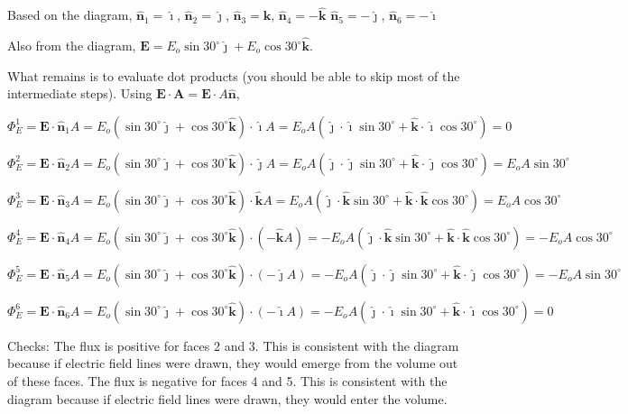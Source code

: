 \documentclass{article}
\newcommand{\ihat}[0]{\hat{\boldsymbol{\imath}}}
\newcommand{\jhat}[0]{\hat{\boldsymbol{\jmath}}}
\newcommand{\khat}[0]{\hat{\boldsymbol{k}}}
\begin{document}
Based on the diagram, $\hat{\mathbf{n}}_1=\ihat$, $\hat{\mathbf{n}}_2=\jhat$, $\hat{\mathbf{n}}_3=\khat$, $\hat{\mathbf{n}}_4=-\khat$
$\hat{\mathbf{n}}_5=-\jhat$, $\hat{\mathbf{n}}_6=-\ihat$

Also from the diagram, $\mathbf{E}=E_o\sin30^\circ\jhat+E_o\cos30^\circ\khat$.

What remains is to evaluate dot products (you should be able to skip most of the intermediate steps). Using $\mathbf{E}\cdot\mathbf{A}=\mathbf{E}\cdot A\hat{\mathbf{n}}$,

\begin{equation}
\Phi_E^1=\mathbf{E}\cdot \hat{\mathbf{n}}_1A=E_o(\sin 30^\circ\jhat+\cos 30^\circ\khat)\cdot\ihat A = E_oA(\jhat\cdot\ihat\sin 30^\circ+\khat\cdot\ihat\cos 30^\circ)=0
\end{equation}

\begin{equation}
\Phi_E^2=\mathbf{E}\cdot \hat{\mathbf{n}}_2A=E_o(\sin 30^\circ\jhat+\cos 30^\circ\khat)\cdot\jhat A = E_oA(\jhat\cdot\jhat\sin 30^\circ+\khat\cdot\jhat\cos 30^\circ)=E_oA\sin 30^\circ
\end{equation}

\begin{equation}
\Phi_E^3=\mathbf{E}\cdot \hat{\mathbf{n}}_3A=E_o(\sin 30^\circ\jhat+\cos 30^\circ\khat)\cdot\khat A = E_oA(\jhat\cdot\khat\sin 30^\circ+\khat\cdot\khat\cos 30^\circ)=E_oA\cos 30^\circ
\end{equation}

\begin{equation}
\Phi_E^4=\mathbf{E}\cdot \hat{\mathbf{n}}_4A=E_o(\sin 30^\circ\jhat+\cos 30^\circ\khat)\cdot(-\khat A) = -E_oA(\jhat\cdot\khat\sin 30^\circ+\khat\cdot\khat\cos 30^\circ)=-E_oA\cos 30^\circ
\end{equation}

\begin{equation}
\Phi_E^5=\mathbf{E}\cdot \hat{\mathbf{n}}_5A=E_o(\sin 30^\circ\jhat+\cos 30^\circ\khat)\cdot(-\jhat A) = -E_oA(\jhat\cdot\jhat\sin 30^\circ+\khat\cdot\jhat\cos 30^\circ)=-E_oA\sin 30^\circ
\end{equation}

\begin{equation}
\Phi_E^6=\mathbf{E}\cdot \hat{\mathbf{n}}_6A=E_o(\sin 30^\circ\jhat+\cos 30^\circ\khat)\cdot(-\ihat A) =  -E_oA(\jhat\cdot\ihat\sin 30^\circ+\khat\cdot\ihat\cos 30^\circ)=0
\end{equation}

Checks: The flux is positive for faces 2 and 3. This is consistent with the diagram because if electric field lines were drawn, they would emerge from the volume out of these faces. The flux is negative for faces 4 and 5. This is consistent with the diagram because if electric field lines were drawn, they would enter the volume.
\fi
\end{document}
